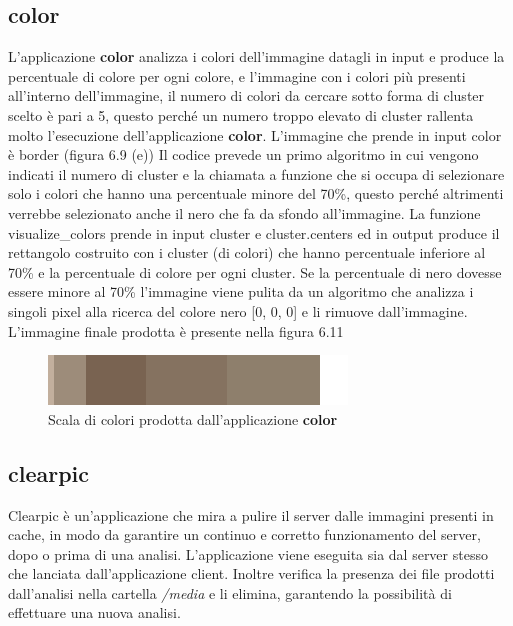 {\subsection{color}
L'applicazione \textbf{color} analizza i colori dell'immagine datagli in input e produce la percentuale di colore per ogni colore, e l'immagine con i colori più presenti all'interno dell'immagine, il numero di colori da cercare sotto forma di cluster scelto è pari a 5, questo perché un numero troppo elevato di cluster rallenta molto l'esecuzione dell'applicazione \textbf{color}.
L'immagine che prende in input color è border (figura 6.9 (e))
Il codice prevede un primo algoritmo in cui vengono indicati il numero di cluster e la chiamata a funzione che si occupa di selezionare solo i colori che hanno una percentuale minore del 70\%, questo perché altrimenti verrebbe selezionato anche il nero che fa da sfondo all'immagine.
\newline
La funzione visualize\_colors prende in input cluster e cluster.centers ed in output produce il rettangolo costruito con i cluster (di colori) che hanno percentuale inferiore al 70\% e la percentuale di colore per ogni cluster.
Se la percentuale di nero dovesse essere minore al 70\% l'immagine viene pulita da un algoritmo che analizza i singoli pixel alla ricerca del colore nero [0, 0, 0] e li rimuove dall'immagine.
L'immagine finale prodotta è presente nella figura 6.11
\begin{figure}[h]
	\begin{center}
		\includegraphics[scale=0.5]{figure/capitolo6/color.png}
	\end{center}
	\caption{Scala di colori prodotta dall'applicazione \textbf{color}}	
\end{figure}
\newpage
\subsection{clearpic}
Clearpic è un'applicazione che mira a pulire il server dalle immagini presenti in cache, in modo da garantire un continuo e corretto funzionamento del server, dopo o prima di una analisi.
L'applicazione viene eseguita sia dal server stesso che lanciata dall'applicazione client.
Inoltre verifica la presenza dei file prodotti dall'analisi nella cartella \textit{/media} e li elimina, garantendo la possibilità di effettuare una nuova analisi.
\newpage
}
